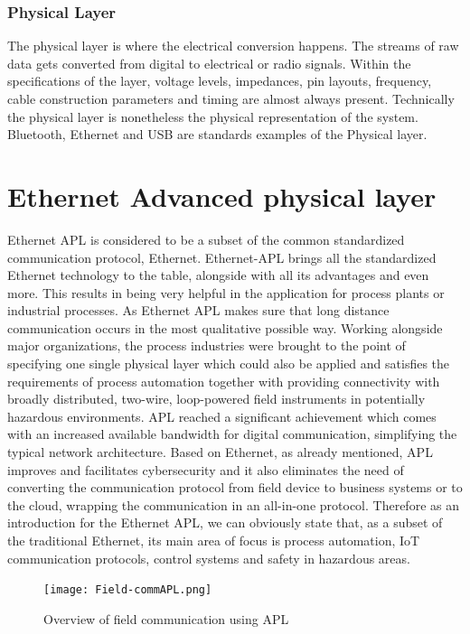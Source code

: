\documentclass[conference]{IEEEtran}
\begin{document}
\subsubsection{Physical Layer}
The physical layer is where the electrical conversion happens. The streams of raw data gets converted from digital to electrical or radio signals. Within the specifications of the layer, voltage levels, impedances, pin layouts, frequency, cable construction parameters and timing are almost always present. Technically the physical layer is nonetheless the physical representation of the system. Bluetooth, Ethernet and USB are standards examples of the Physical layer.
\cite{b4}\cite{b5}
\section{Ethernet Advanced physical layer}
Ethernet APL is considered to be a subset of the common standardized communication protocol, Ethernet. Ethernet-APL brings all the standardized Ethernet technology to the table, alongside with all its advantages and even more. This results in being very helpful in the application for process plants or industrial processes. As Ethernet APL makes sure that long distance communication occurs in the most qualitative possible way. Working alongside major organizations, the process industries were brought to the point of specifying one single physical layer which could also be applied and satisfies the requirements of process automation together with providing connectivity with broadly distributed, two-wire, loop-powered field instruments in potentially hazardous environments. APL reached a significant achievement which comes with an increased available bandwidth for digital communication, simplifying the typical network architecture. Based on Ethernet, as already mentioned, APL improves and facilitates cybersecurity and it also eliminates the need of converting the communication protocol from field device to business systems or to the cloud, wrapping the communication in an all-in-one protocol. Therefore as an introduction for the Ethernet APL, we can obviously state that, as a subset of the traditional Ethernet, its main area of focus is process automation, IoT communication protocols, control systems and safety in hazardous areas.
\begin{figure}[htbp]
    \centerline{\texttt{[image: Field-commAPL.png]}}
    \caption{Overview of field communication using APL \cite{b6}}
    \label{fca}
\end{figure}
\end{document}
